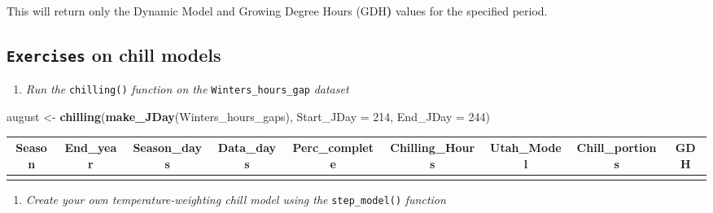 \documentclass[
]{article}
\newenvironment{Shaded}{\begin{snugshade}}{\end{snugshade}}
\newcommand{\AttributeTok}[1]{\textcolor[rgb]{0.13,0.29,0.53}{#1}}
\newcommand{\DecValTok}[1]{\textcolor[rgb]{0.00,0.00,0.81}{#1}}
\newcommand{\FunctionTok}[1]{\textcolor[rgb]{0.13,0.29,0.53}{\textbf{#1}}}
\newcommand{\NormalTok}[1]{#1}
\newcommand{\OtherTok}[1]{\textcolor[rgb]{0.56,0.35,0.01}{#1}}
\providecommand{\tightlist}{%
  \setlength{\itemsep}{0pt}\setlength{\parskip}{0pt}}
\begin{document}
This will return only the Dynamic Model and Growing Degree Hours (GDH\textbf{)} values for the specified period.

\subsection{\texorpdfstring{\texttt{Exercises} on chill models}{Exercises on chill models}}\label{exercises-on-chill-models}

\begin{enumerate}
\def\labelenumi{\arabic{enumi}.}
\tightlist
\item
  \emph{Run the} \texttt{chilling()} \emph{function on the} \texttt{Winters\_hours\_gap} \emph{dataset}
\end{enumerate}

\begin{Shaded}
\begin{Highlighting}[]
\NormalTok{august }\OtherTok{\textless{}{-}} \FunctionTok{chilling}\NormalTok{(}\FunctionTok{make\_JDay}\NormalTok{(Winters\_hours\_gaps), }\AttributeTok{Start\_JDay =} \DecValTok{214}\NormalTok{, }\AttributeTok{End\_JDay =} \DecValTok{244}\NormalTok{)}
\end{Highlighting}
\end{Shaded}

\begin{table}
\centering\begingroup\fontsize{15}{17}\selectfont

\begin{tabular}{c|c|c|c|c|c|c|c|c}
\hline
Season & End\_year & Season\_days & Data\_days & Perc\_complete & Chilling\_Hours & Utah\_Model & Chill\_portions & GDH\\
\hline
\cellcolor{gray!10}{2007/2008} & \cellcolor{gray!10}{2008} & \cellcolor{gray!10}{31} & \cellcolor{gray!10}{31} & \cellcolor{gray!10}{100} & \cellcolor{gray!10}{0} & \cellcolor{gray!10}{-569.5} & \cellcolor{gray!10}{0} & \cellcolor{gray!10}{9933.327}\\
\hline
\end{tabular}
\endgroup{}
\end{table}

\begin{enumerate}
\def\labelenumi{\arabic{enumi}.}
\setcounter{enumi}{1}
\tightlist
\item
  \emph{Create your own temperature-weighting chill model using the} \texttt{step\_model()} \emph{function}
\end{enumerate}
\end{document}
